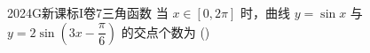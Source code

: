 
\begin{problem}{2024}{G}{新课标I卷}{7}{三角函数}
当 $x\in[0,2\pi]$ 时，曲线 $y=\sin x$ 与 $y=2\sin\left(3x-\dfrac{\pi}{6}\right)$ 的交点个数为
(\hspace{1cm})
\begin{choices}
\end{choices}
\end{problem}